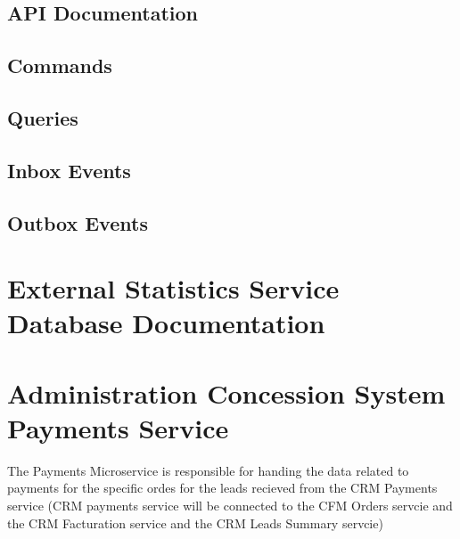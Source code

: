 \documentclass[letterpaper,10pt,english]{sphinxmanual}
\begin{document}
\subsection{API Documentation}
\label{\detokenize{administration_concession_system/external_statistics_service:api-documentation}}

\subsection{Commands}
\label{\detokenize{administration_concession_system/external_statistics_service:commands}}

\subsection{Queries}
\label{\detokenize{administration_concession_system/external_statistics_service:queries}}

\subsection{Inbox Events}
\label{\detokenize{administration_concession_system/external_statistics_service:inbox-events}}

\subsection{Outbox Events}
\label{\detokenize{administration_concession_system/external_statistics_service:outbox-events}}

\section{External Statistics Service Database Documentation}
\label{\detokenize{administration_concession_system/external_statistics_service:external-statistics-service-database-documentation}}
\sphinxstepscope


\section{Administration Concession System Payments Service}
\label{\detokenize{administration_concession_system/payments_service:administration-concession-system-payments-service}}\label{\detokenize{administration_concession_system/payments_service::doc}}
\sphinxAtStartPar
The  Payments Microservice is responsible for handing the data related to payments for the specific ordes for the leads recieved from the CRM Payments service (CRM payments service will be connected to the CFM Orders servcie and the CRM Facturation service and the CRM Leads Summary servcie)
\end{document}
